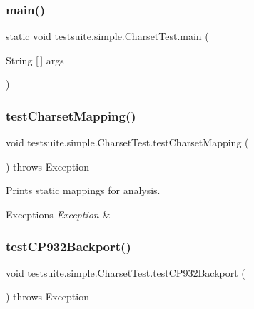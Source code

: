 \subsubsection{\texorpdfstring{main()}{main()}}
{\footnotesize\ttfamily static void testsuite.\+simple.\+Charset\+Test.\+main (\begin{DoxyParamCaption}\item[{String \mbox{[}$\,$\mbox{]}}]{args }\end{DoxyParamCaption})\hspace{0.3cm}{\ttfamily [static]}}

\mbox{\label{classtestsuite_1_1simple_1_1_charset_test_ace6046bed9bc3e29734e98003258fd58}} 
\subsubsection{\texorpdfstring{test\+Charset\+Mapping()}{testCharsetMapping()}}
{\footnotesize\ttfamily void testsuite.\+simple.\+Charset\+Test.\+test\+Charset\+Mapping (\begin{DoxyParamCaption}{ }\end{DoxyParamCaption}) throws Exception}

Prints static mappings for analysis.


\begin{DoxyExceptions}{Exceptions}
{\em Exception} & \\
\hline
\end{DoxyExceptions}
\mbox{\label{classtestsuite_1_1simple_1_1_charset_test_a7c62b0525cd9efee8029643a749d3c18}} 
\subsubsection{\texorpdfstring{test\+C\+P932\+Backport()}{testCP932Backport()}}
{\footnotesize\ttfamily void testsuite.\+simple.\+Charset\+Test.\+test\+C\+P932\+Backport (\begin{DoxyParamCaption}{ }\end{DoxyParamCaption}) throws Exception}

